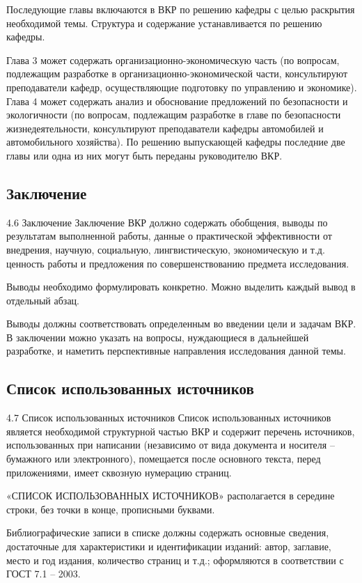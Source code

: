     Последующие главы включаются в ВКР по решению кафедры с целью раскрытия
    необходимой темы. Структура и содержание устанавливается по решению кафедры.

    Глава 3 может содержать организационно-экономическую часть (по вопросам,
    подлежащим разработке в организационно-экономической части, консультируют
    преподаватели кафедр, осуществляющие подготовку по управлению и экономике).
    Глава 4 может содержать анализ и обоснование предложений по безопасности и
    экологичности (по вопросам, подлежащим разработке в главе по безопасности 
    жизнедеятельности, консультируют преподаватели кафедры автомобилей и автомобильного
    хозяйства).
    По решению выпускающей кафедры последние две главы или одна из них могут быть
    переданы руководителю ВКР.

    \subsection{Заключение}
    4.6 Заключение
    Заключение ВКР должно содержать обобщения, выводы по результатам выполненной
    работы, данные о практической эффективности от внедрения, научную, социальную,
    лингвистическую, экономическую и т.д. ценность работы и предложения по
    совершенствованию предмета исследования.
    
    Выводы необходимо формулировать
    конкретно. Можно выделить каждый вывод в отдельный абзац. 
    
    Выводы должны
    соответствовать определенным во введении цели и задачам ВКР. В заключении можно
    указать на вопросы, нуждающиеся в дальнейшей разработке, и наметить перспективные
    направления исследования данной темы.

    \subsection{Список использованных источников}
    4.7 Список использованных источников
    Список использованных источников является необходимой структурной частью ВКР
    и содержит перечень источников, использованных при написании (независимо от вида
    документа и носителя – бумажного или электронного), помещается после основного текста,
    перед приложениями, имеет сквозную нумерацию страниц.
    
    «СПИСОК
    ИСПОЛЬЗОВАННЫХ ИСТОЧНИКОВ» располагается в середине строки, без точки в конце,
    прописными буквами.

    Библиографические записи в списке должны содержать основные сведения,
    достаточные для характеристики и идентификации изданий: автор, заглавие, место и год
    издания, количество страниц и т.д.; оформляются в соответствии с ГОСТ 7.1 – 2003.

